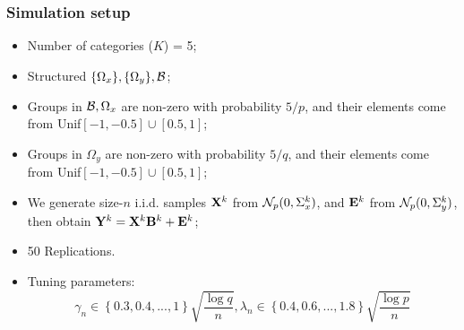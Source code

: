 \documentclass[10pt]{beamer}
\theoremstyle{definition}
\begin{document}
\begin{frame}
\frametitle{Simulation setup}
\begin{itemize}
\item Number of categories ($K$) = 5;

\item Structured $\{ \Omega_x\}, \{\Omega_y\}, {\cal{B}}$;

\item Groups in ${\cal{B}},\Omega_x$ are non-zero with probability $5/p$, and their elements come from Unif$[-1, -0.5] \cup [0.5,1]$;

\item Groups in $\Omega_y$ are non-zero with probability $5/q$, and their elements come from Unif$[-1, -0.5] \cup [0.5,1]$;

\item We generate size-$n$ i.i.d. samples ${\mathbf{X}}^k$ from ${\cal{N}}_p(0, \Sigma_x^k)$, and ${\mathbf{E}}^k$ from ${\cal{N}}_p(0, \Sigma_y^k)$, then obtain ${\mathbf{Y}}^k = {\mathbf{X}}^k {\mathbf{B}}^k + {\mathbf{E}}^k$;

\item 50 Replications.

\item Tuning parameters:
$$
\gamma_n \in \left\{ 0.3, 0.4, ..., 1 \right\} \sqrt{\frac{\log q}{n}}, 
\lambda_n \in \left\{ 0.4, 0.6, ..., 1.8 \right\} \sqrt{\frac{\log p}{n}}
$$

\end{itemize}
\end{frame}
\end{document}
